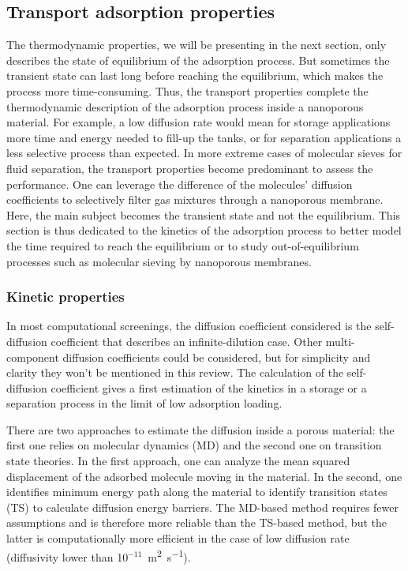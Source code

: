 \documentclass[main.tex]{subfiles}
\begin{document}
\subsection{Transport adsorption properties}

The thermodynamic properties, we will be presenting in the next section, only describes the state of equilibrium of the adsorption process. But sometimes the transient state can last long before reaching the equilibrium, which makes the process more time-consuming. Thus, the transport properties complete the thermodynamic description of the adsorption process inside a nanoporous material. For example, a low diffusion rate would mean for storage applications more time and energy needed to fill-up the tanks, or for separation applications a less selective process than expected. In more extreme cases of molecular sieves for fluid separation, the transport properties become predominant to assess the performance. One can leverage the difference of the molecules' diffusion coefficients to selectively filter gas mixtures through a nanoporous membrane.\autocite{Miandoab_2021} Here, the main subject becomes the transient state and not the equilibrium. This section is thus dedicated to the kinetics of the adsorption process to better model the time required to reach the equilibrium or to study out-of-equilibrium processes such as molecular sieving by nanoporous membranes.

\subsubsection{Kinetic properties}

In most computational screenings, the diffusion coefficient considered is the self-diffusion coefficient that describes an infinite-dilution case. Other multi-component diffusion coefficients could be considered, but for simplicity and clarity they won't be mentioned in this review. The calculation of the self-diffusion coefficient gives a first estimation of the kinetics in a storage or a separation process in the limit of low adsorption loading.

There are two approaches to estimate the diffusion inside a porous material: the first one relies on molecular dynamics (MD) and the second one on transition state theories. In the first approach, one can analyze the mean squared displacement of the adsorbed molecule moving in the material. In the second, one identifies minimum energy path along the material to identify transition states (TS) to calculate diffusion energy barriers. The MD-based method requires fewer assumptions and is therefore more reliable than the TS-based method, but the latter is computationally more efficient in the case of low diffusion rate (diffusivity lower than 10$^{-11}$~\si{\square\meter\per\second}).
\end{document}
